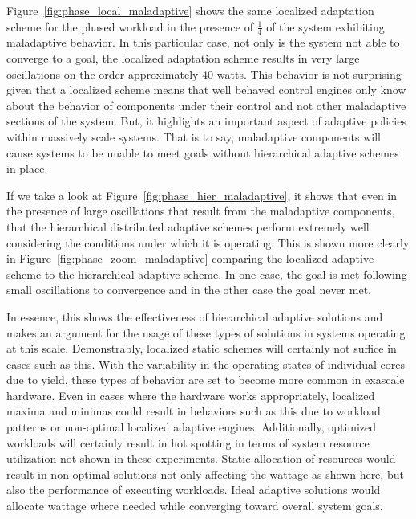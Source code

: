             Figure~\ref{fig:phase_local_maladaptive} shows the same localized adaptation scheme for the phased workload in the presence of $\frac{1}{4}$ of the system exhibiting maladaptive behavior. In this particular case, not only is the system not able to converge to a goal, the localized adaptation scheme results in very large oscillations on the order approximately 40 watts. This behavior is not surprising given that a localized scheme means that well behaved control engines only know about the behavior of components under their control and not other maladaptive sections of the system. But, it highlights an important aspect of adaptive policies within massively scale systems. That is to say, maladaptive components will cause systems to be unable to meet goals without hierarchical adaptive schemes in place.
            
            If we take a look at Figure~\ref{fig:phase_hier_maladaptive}, it shows that even in the presence of large oscillations that result from the maladaptive components, that the hierarchical distributed adaptive schemes perform extremely well considering the conditions under which it is operating. This is shown more clearly in Figure~\ref{fig:phase_zoom_maladaptive} comparing the localized adaptive scheme to the hierarchical adaptive scheme. In one case, the goal is met following small oscillations to convergence and in the other case the goal never met.
    
            In essence, this shows the effectiveness of hierarchical adaptive solutions and makes an argument for the usage of these types of solutions in systems operating at this scale. Demonstrably, localized static schemes will certainly not suffice in cases such as this. With the variability in the operating states of individual cores due to yield, these types of behavior are set to become more common in exascale hardware. Even in cases where the hardware works appropriately, localized maxima and minimas could result in behaviors such as this due to workload patterns or non-optimal localized adaptive engines. Additionally, optimized workloads will certainly result in hot spotting in terms of system resource utilization not shown in these experiments. Static allocation of resources would result in non-optimal solutions not only affecting the wattage as shown here, but also the performance of executing workloads. Ideal adaptive solutions would allocate wattage where needed while converging toward overall system goals.
